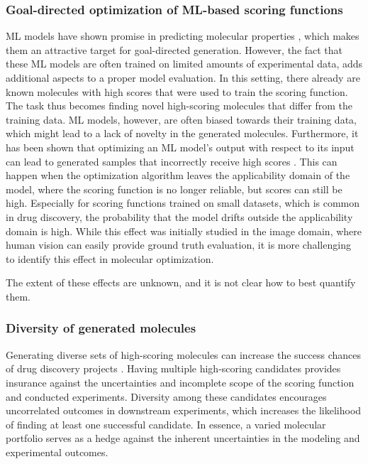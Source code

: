 \subsubsection{Goal-directed optimization of ML-based scoring functions}
\ac{ML} models have shown promise in predicting molecular properties
\citep{mayrDeepToxToxicityPrediction2016,klambauerMachineLearningDrug2019,vamathevanApplicationsMachineLearning2019,chenRiseDeepLearning2018,stokesDeepLearningApproach2020},
which makes them an attractive target for goal-directed generation. However, the fact that these
\ac{ML} models are often trained on limited amounts of experimental data, adds additional aspects
to a proper model evaluation. In this setting, there already are known molecules with high scores
that were used to train the scoring function. The task thus becomes finding novel
high-scoring molecules that differ from the training data. \ac{ML} models, however, are
often biased towards their training data, which might lead to a lack of novelty in the generated
molecules.
Furthermore, it has been shown that optimizing an \ac{ML} model's output with respect to its input
can lead to generated samples that incorrectly receive high scores
\citep{szegedyIntriguingPropertiesNeural2014,goodfellowExplainingHarnessingAdversarial2015}. This
can happen when the optimization algorithm leaves the applicability domain of the model, where the
scoring function is no longer reliable, but scores can still be high. Especially for scoring
functions trained on small datasets, which is common in drug discovery, the probability that the
model drifts outside the applicability domain is high. While this effect was initially studied in
the image domain, where human vision can easily provide ground truth evaluation, it is more
challenging to identify this effect in molecular optimization.

The extent of these effects are unknown, and it is not clear how to best quantify them.

\subsubsection{Diversity of generated molecules}
Generating diverse sets of high-scoring molecules can increase the success chances of drug discovery
projects \citep{martinDiverseViewpointsComputational2001,gorseDiversityMedicinalChemistry2006}.
Having multiple high-scoring candidates provides insurance against the uncertainties and incomplete
scope of the scoring function and conducted experiments. Diversity among these candidates encourages
uncorrelated outcomes in downstream experiments, which increases the likelihood of finding at least
one successful candidate. In essence, a varied molecular portfolio serves as a hedge against the
inherent uncertainties in the modeling and experimental outcomes.

